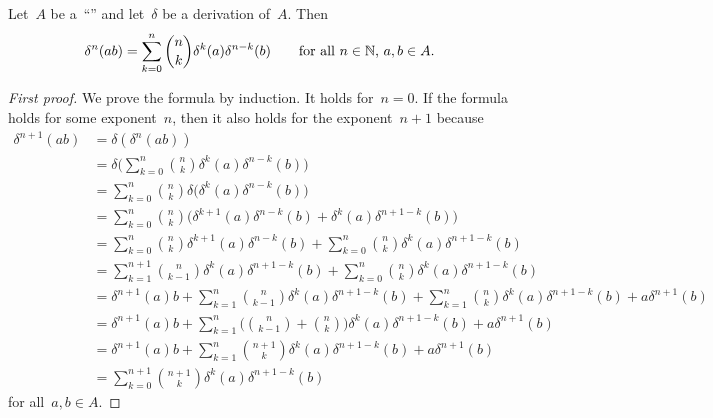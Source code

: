 \begin{lemma}
	Let~$A$ be a~\enquote{\algebra{$\kf$}} and let~$\delta$ be a derivation of~$A$.
	Then
	\[
		\delta^n(ab)
		=
		\sum_{k=0}^n
		\binom{n}{k}
		\delta^k(a) \delta^{n-k}(b)
		\qquad
		\text{for all~$n \in \mathbb{N}$,~$a, b \in A$.}
	\]
\end{lemma}


\begin{proof}[First proof]
	We prove the formula by induction.
	It holds for~$n = 0$.
	If the formula holds for some exponent~$n$, then it also holds for the exponent~$n + 1$ because
	\begingroup
	\allowdisplaybreaks
	\begin{align*}
		\delta^{n+1}(ab)
		&=
		\delta( \delta^n(ab) )
		\\
		&=
		\delta
		\Biggl(
			\sum_{k=0}^n
			\binom{n}{k}
			\delta^k(a) \delta^{n-k}(b)
		\Biggr)
		\\
		&=
		\sum_{k=0}^n
		\binom{n}{k}
		\delta
		\bigl(
			\delta^k(a) \delta^{n-k}(b)
		\bigr)
		\\
		&=
		\sum_{k=0}^n
		\binom{n}{k}
		\bigl(
			\delta^{k+1}(a) \delta^{n-k}(b)
			+
			\delta^k(a) \delta^{n+1-k}(b)
		\bigr)
		\\
		&=
		\sum_{k=0}^n
		\binom{n}{k}
		\delta^{k+1}(a) \delta^{n-k}(b)
		+
		\sum_{k=0}^n
		\binom{n}{k}
		\delta^k(a) \delta^{n+1-k}(b)
		\\
		&=
		\sum_{k=1}^{n+1}
		\binom{n}{k-1}
		\delta^{k}(a) \delta^{n+1-k}(b)
		+
		\sum_{k=0}^n
		\binom{n}{k}
		\delta^k(a) \delta^{n+1-k}(b)
		\\
		&=
		\delta^{n+1}(a) b
		+
		\sum_{k=1}^n
		\binom{n}{k-1}
		\delta^{k}(a) \delta^{n+1-k}(b)
		+
		\sum_{k=1}^n
		\binom{n}{k}
		\delta^k(a) \delta^{n+1-k}(b)
		+
		a \delta^{n+1}(b)
		\\
		&=
		\delta^{n+1}(a) b
		+
		\sum_{k=1}^n
		\Biggl(
			\binom{n}{k-1}
			+
			\binom{n}{k}
		\Biggr)
		\delta^k(a) \delta^{n+1-k}(b)
		+
		a \delta^{n+1}(b)
		\\
		&=
		\delta^{n+1}(a) b
		+
		\sum_{k=1}^n
		\binom{n+1}{k}
		\delta^k(a) \delta^{n+1-k}(b)
		+
		a \delta^{n+1}(b)
		\\
		&=
		\sum_{k=0}^{n+1}
		\binom{n+1}{k}
		\delta^k(a) \delta^{n+1-k}(b)
	\end{align*}
	\endgroup
	for all~$a, b \in A$.
\end{proof}


